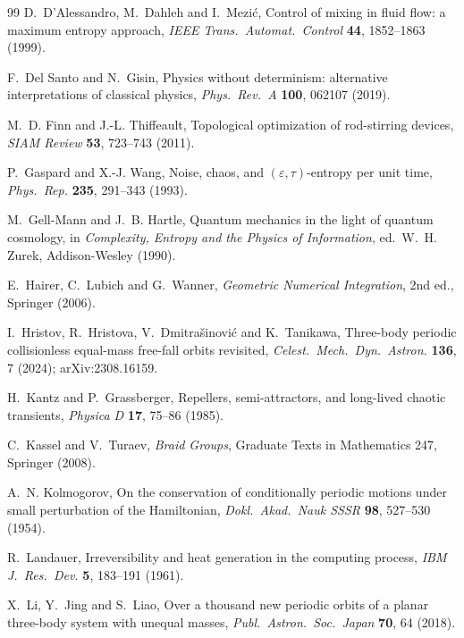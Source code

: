 \documentclass[11pt]{article}
\theoremstyle{remark}
\begin{document}
\begin{thebibliography}{99}
 D.~D'Alessandro, M.~Dahleh and I.~Mezi\'c, Control of mixing in fluid flow: a maximum
entropy approach, \emph{IEEE Trans.\ Automat.\ Control} \textbf{44}, 1852--1863 (1999).

 F.~Del Santo and N.~Gisin, Physics without determinism: alternative
interpretations of classical physics, \emph{Phys.\ Rev.\ A} \textbf{100}, 062107 (2019).

 M.~D. Finn and J.-L. Thiffeault, Topological optimization of rod-stirring
devices, \emph{SIAM Review} \textbf{53}, 723--743 (2011).

 P.~Gaspard and X.-J. Wang, Noise, chaos, and $(\varepsilon,\tau)$-entropy per unit
time, \emph{Phys.\ Rep.} \textbf{235}, 291--343 (1993).

 M.~Gell-Mann and J.~B. Hartle, Quantum mechanics in the light of quantum
cosmology, in \emph{Complexity, Entropy and the Physics of Information}, ed.\ W.~H. Zurek, Addison-Wesley
(1990).

 E.~Hairer, C.~Lubich and G.~Wanner, \emph{Geometric Numerical Integration},
2nd ed., Springer (2006).

 I.~Hristov, R.~Hristova, V.~Dmitra\v{s}inovi\'c and K.~Tanikawa, Three-body periodic
collisionless equal-mass free-fall orbits revisited, \emph{Celest.\ Mech.\ Dyn.\ Astron.} \textbf{136}, 7
(2024); arXiv:2308.16159.

 H.~Kantz and P.~Grassberger, Repellers, semi-attractors, and long-lived chaotic
transients, \emph{Physica D} \textbf{17}, 75--86 (1985).

 C.~Kassel and V.~Turaev, \emph{Braid Groups}, Graduate Texts in Mathematics 247,
Springer (2008).

 A.~N. Kolmogorov, On the conservation of conditionally periodic motions under small
perturbation of the Hamiltonian, \emph{Dokl.\ Akad.\ Nauk SSSR} \textbf{98}, 527--530 (1954).

 R.~Landauer, Irreversibility and heat generation in the computing process, \emph{IBM J.\
Res.\ Dev.} \textbf{5}, 183--191 (1961).

 X.~Li, Y.~Jing and S.~Liao, Over a thousand new periodic orbits of a planar
three-body system with unequal masses, \emph{Publ.\ Astron.\ Soc.\ Japan} \textbf{70}, 64 (2018).


\end{thebibliography}
\end{document}
